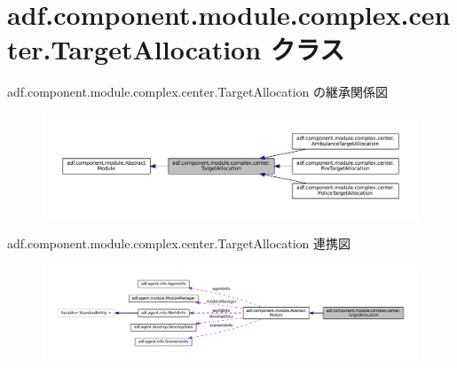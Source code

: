 \hypertarget{classadf_1_1component_1_1module_1_1complex_1_1center_1_1TargetAllocation}{}\section{adf.\+component.\+module.\+complex.\+center.\+Target\+Allocation クラス}
\label{classadf_1_1component_1_1module_1_1complex_1_1center_1_1TargetAllocation}


adf.\+component.\+module.\+complex.\+center.\+Target\+Allocation の継承関係図
\nopagebreak
\begin{figure}[H]
\begin{center}
\leavevmode
\includegraphics[width=350pt]{classadf_1_1component_1_1module_1_1complex_1_1center_1_1TargetAllocation__inherit__graph}
\end{center}
\end{figure}


adf.\+component.\+module.\+complex.\+center.\+Target\+Allocation 連携図
\nopagebreak
\begin{figure}[H]
\begin{center}
\leavevmode
\includegraphics[width=350pt]{classadf_1_1component_1_1module_1_1complex_1_1center_1_1TargetAllocation__coll__graph}
\end{center}
\end{figure}
